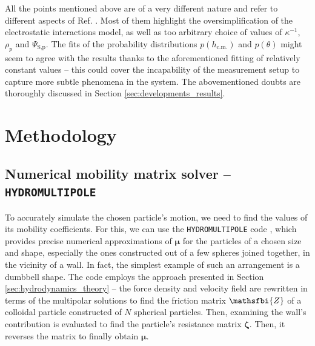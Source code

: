 \documentclass{master_thesis}
\def\code#1{\texttt{#1}}
\begin{document}
All the points mentioned above are of a very different nature and refer to different aspects of Ref. \cite{verweij2021}. Most of them highlight the oversimplification of the electrostatic interactions model, as well as too arbitrary choice of values of $\kappa^{-1}$, $\rho_p$ and $\Psi_{\textrm{S,p}}$. The fits of the probability distributions $p(h_{\textrm{c.m.}})$ and $p(\theta)$ might seem to agree with the results thanks to the aforementioned fitting of relatively constant values -- this could cover the incapability of the measurement setup to capture more subtle phenomena in the system. The abovementioned doubts are thoroughly discussed in Section \ref{sec:developments_results}.

\chapter{Methodology} \label{chapter:methodology}

\section{Numerical mobility matrix solver -- \code{HYDROMULTIPOLE}} \label{sec:methodology:hydromultipole}

To accurately simulate the chosen particle's motion, we need to find the values of its mobility coefficients. For this, we can use the \code{HYDROMULTIPOLE} code \cite{cichocki2000}, which provides precise numerical approximations of $\bm{\mu}$ for the particles of a chosen size and shape, especially the ones constructed out of a few spheres joined together, in the vicinity of a wall. In fact, the simplest example of such an arrangement is a dumbbell shape. The code employs the approach presented in Section \ref{sec:hydrodynamics_theory} -- the force density and velocity field are rewritten in terms of the multipolar solutions to find the friction matrix $\mathsfbi{Z}$ of a colloidal particle constructed of $N$ spherical particles. Then, examining the wall's contribution is evaluated to find the particle's resistance matrix $\bm{\zeta}$. Then, it reverses the matrix to finally obtain $\bm{\mu}$. 
\end{document}
